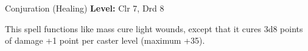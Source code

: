 {Conjuration (Healing)}
{
	\textbf{Level:}
	Clr 7, Drd 8\\
}
{
	This spell functions like mass cure light wounds, except that it cures 3d8 points of damage +1 point per caster level (maximum +35).

}

